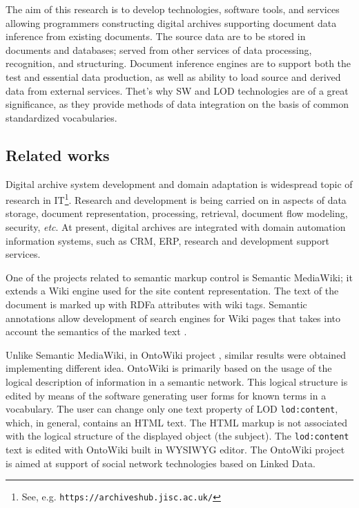 \documentclass[conference,a4paper]{IEEEtran}
\providecommand\url[1]{\texttt{#1}}
\begin{document}
The aim of this research is to develop technologies, software tools, and services allowing programmers constructing digital archives supporting document data inference from existing documents.  The source data are to be stored in documents and databases; served from other services of data processing, recognition, and structuring.  Document inference engines are to support both the test and essential data production, as well as ability to load source and derived data from external services.  Thet's why SW and LOD technologies are of a great significance, as they provide methods of data integration on the basis of common standardized vocabularies.

\subsection{Related works}
\label{sec:relwks}

Digital archive system development and domain adaptation is wide\-spre\-ad topic of research in IT\footnote{See, e.g. \url{https://archiveshub.jisc.ac.uk/}}.  Research and development is being carried on in aspects of data storage, document representation, processing, retrieval, document flow modeling, security, \textit{etc}.  At present, digital archives are integrated with domain automation information systems, such as CRM, ERP, research and development support services.

One of the projects related to semantic markup control is Semantic MediaWiki; it extends a Wiki engine used for the site content representation.  The text of the document is marked up with RDFa attributes with wiki tags.  Semantic annotations allow development of search engines for Wiki pages that takes into account the semantics of the marked text \cite{c6}.

Unlike Semantic MediaWiki, in OntoWiki project \cite{ontowiki}, similar results were obtained implementing different idea.  OntoWiki is primarily based on the usage of the logical description of information in a semantic network.  This logical structure is edited by means of the software generating user forms for known terms in a vocabulary.  The user can change only one text property of LOD \texttt{lod:content}, which, in general, contains an HTML text.  The HTML markup is not associated with the logical structure of the displayed object (the subject).  The \texttt{lod:content} text is edited with OntoWiki built in WYSIWYG editor.  The OntoWiki project is aimed at support of social network technologies based on Linked Data.
\end{document}
